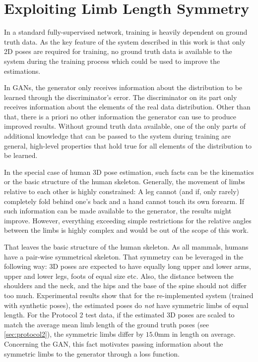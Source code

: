 \section{Exploiting Limb Length Symmetry}
\label{sec:loss-function-modification}

In a standard fully-supervised network, training is heavily dependent on ground truth data.
As the key feature of the system described in this work is that only 2D poses are required for training, no ground truth data is available to the system during the training process which could be used to improve the estimations.

In GANs, the generator only receives information about the distribution to be learned through the discriminator's error.
The discriminator on its part only receives information about the elements of the real data distribution.
Other than that, there is a priori no other information the generator can use to produce improved results.
Without ground truth data available, one of the only parts of additional knowledge that can be passed to the system during training are general, high-level properties that hold true for all elements of the distribution to be learned.

In the special case of human 3D pose estimation, such facts can be the kinematics or the basic structure of the human skeleton.
Generally, the movement of limbs relative to each other is highly constrained:
A leg cannot (and if, only rarely) completely fold behind one's back and a hand cannot touch its own forearm.
If such information can be made available to the generator, the results might improve.
However, everything exceeding simple restrictions for the relative angles between the limbs is highly complex and would be out of the scope of this work.

That leaves the basic structure of the human skeleton.
As all mammals, humans have a pair-wise symmetrical skeleton.
That symmetry can be leveraged in the following way:
3D poses are expected to have equally long upper and lower arms, upper and lower legs, foots of equal size etc.
Also, the distance between the shoulders and the neck, and the hips and the base of the spine should not differ too much.
Experimental results show that for the re-implemented system (trained with synthetic poses), the estimated poses do \emph{not} have symmetric limbs of equal length.
For the Protocol 2 test data, if the estimated 3D poses are scaled to match the average mean limb length of the ground truth poses (see \autoref{sec:protocol2}), the symmetric limbs differ by $15.0$mm in length on average.
Concerning the GAN, this fact motivates passing information about the symmetric limbs to the generator through a loss function.

